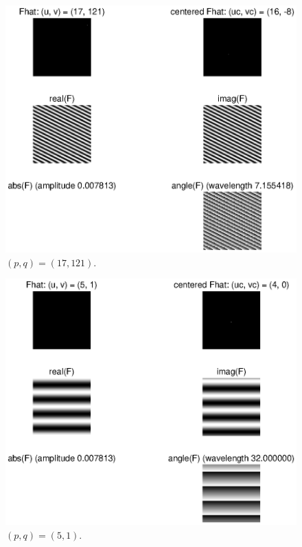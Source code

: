 \documentclass[11pt,a4paper]{article}
\begin{document}
\begin{itemize}
\begin{figure}[!ht]
		\includegraphics[width=0.9\columnwidth]{Q1_p_17_q_121.eps}
		\caption{$(p, q) = (17, 121)$.}
		\label{fig:Q1_p_17_q_121}
	\end{figure}
	\begin{figure}[!ht]
		\footnotesize
		\centering
		\includegraphics[width=0.9\columnwidth]{Q1_p_5_q_1.eps}
		\caption{$(p, q) = (5, 1)$.}
		\label{fig:Q1_p_5_q_1}
	\end{figure}
	\begin{figure}[!ht]
		\footnotesize
		\centering

\end{figure}
\end{itemize}
\end{document}
